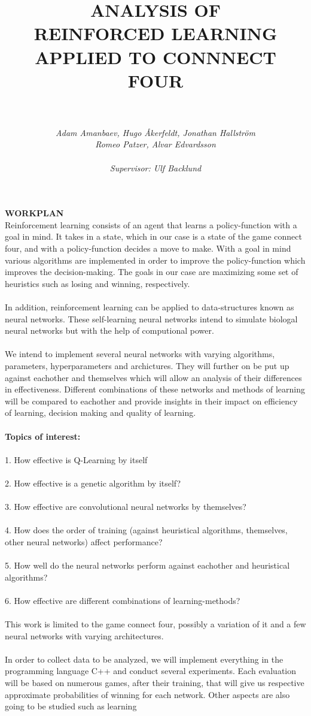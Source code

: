 \documentclass[titlepage]{article}
\title{\textbf{ANALYSIS OF \\REINFORCED LEARNING \\APPLIED TO CONNNECT FOUR}}
\author{\rule{8cm}{0.3mm} \\[0.5in] \textit{Adam Amanbaev, Hugo Åkerfeldt, Jonathan Hallström} \\ \textit{Romeo Patzer, Alvar Edvardsson} \\\\
    \small \textit{Supervisor: Ulf Backlund}
}
\date{}
\begin{document}
\maketitle

\newpage
\noindent
\textbf{WORKPLAN}\\[0.1in]Reinforcement learning consists of an agent that learns a policy-function with a goal in mind. It takes in a state, which in our case is a state of the game connect four, and with a policy-function decides a move to make. With a goal in mind various algorithms are implemented in order to improve the policy-function which improves the decision-making. The goals in our case are maximizing some set of heuristics such as losing and winning, respectively. \\\\In addition, reinforcement learning can be applied to data-structures known as neural networks. These self-learning neural networks intend to simulate biologal neural networks but with the help of computional power. \\\\We intend to implement several neural networks with varying algorithms, parameters, hyperparameters and archictures. They will further on be put up against eachother and themselves which will allow an analysis of their differences in effectiveness. Different combinations of these networks and methods of learning will be compared to eachother and provide insights in their impact on efficiency of learning, decision making and quality of learning. \\\\ \textbf{Topics of interest:} \\\\1. How effective is Q-Learning by itself \\\\2. How effective is a genetic algorithm by itself? \\\\3. How effective are convolutional neural networks by themselves? \\\\4. How does the order of training (against heuristical algorithms, themselves, other neural networks) affect performance? \\\\5. How well do the neural networks perform against eachother and heuristical algorithms? \\\\6. How effective are different combinations of learning-methods? \\\\This work is limited to the game connect four, possibly a variation of it and a few neural networks with varying architectures. \\\\In order to collect data to be analyzed, we will implement everything in the programming language C++ and conduct several experiments. Each evaluation will be based on numerous games, after their training, that will give us respective approximate probabilities of winning for each network. Other aspects are also going to be studied such as learning 
\end{document}
